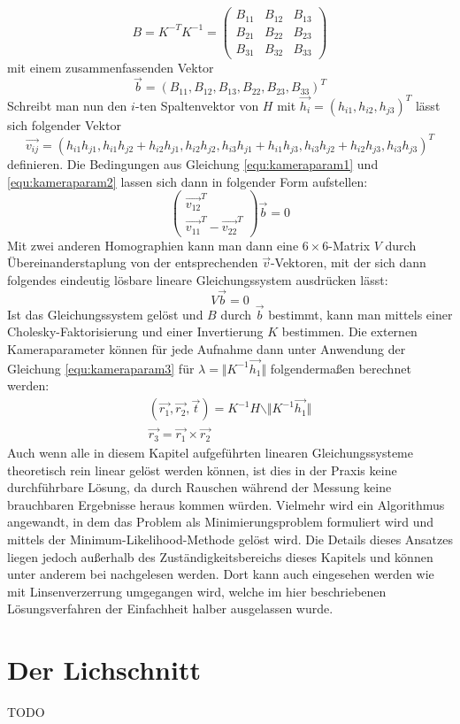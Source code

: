 \begin{equation}
	B = K^{-T}K^{-1} = \begin{pmatrix}
			B_{11} & B_{12} & B_{13} \\
			B_{21} & B_{22} & B_{23} \\
			B_{31} & B_{32} & B_{33}
		\end{pmatrix}
\end{equation}
mit einem zusammenfassenden Vektor
\begin{equation}
	\vec{b} = \left( B_{11}, B_{12}, B_{13}, B_{22}, B_{23}, B_{33} \right)^T
\end{equation}
Schreibt man nun den \(i\)-ten Spaltenvektor von \(H\) mit \(\vec{h_i} = \left( h_{i1}, h_{i2}, h_{j3} \right)^T\) lässt sich folgender Vektor 
\begin{equation}
	\vec{v_{ij}} = \left( h_{i1}h_{j1}, h_{i1}h_{j2}+h_{i2}h_{j1}, h_{i2}h_{j2},h_{i3}h_{j1}+h_{i1}h_{j3}, h_{i3}h_{j2}+h_{i2}h_{j3},h_{i3}h_{j3}\right)^T
\end{equation}
definieren. Die Bedingungen aus Gleichung \ref{equ:kameraparam1} und \ref{equ:kameraparam2} lassen sich dann in folgender Form aufstellen:
\begin{equation}
	\left( \begin{array}{c}\vec{v_{12}}^T\\\vec{v_{11}}^T - \vec{v_{22}}^T\end{array} \right)\vec{b} = 0
\end{equation}
Mit zwei anderen Homographien kann man dann eine \(6 \times 6\)-Matrix \(V\) durch Übereinanderstaplung von der entsprechenden \(\vec{v}\)-Vektoren, mit der sich dann folgendes eindeutig lösbare lineare Gleichungssystem ausdrücken lässt:
\begin{equation}
	V\vec{b} = 0
\end{equation}
Ist das Gleichungssystem gelöst und \(B\) durch \(\vec{b}\) bestimmt, kann man mittels einer Cholesky-Faktorisierung und einer Invertierung \(K\) bestimmen. Die externen Kameraparameter können für jede Aufnahme dann unter Anwendung der Gleichung \ref{equ:kameraparam3} für \(\lambda = \Vert K^{-1}\vec{h_1} \Vert\) folgendermaßen berechnet werden:
\begin{gather}
	\left(\vec{r_1},\vec{r_2},\vec{t}\right) = K^{-1}H \backslash \Vert K^{-1}\vec{h_1} \Vert \\
	\vec{r_3} = \vec{r_1} \times \vec{r_2}
\end{gather}
Auch wenn alle in diesem Kapitel aufgeführten linearen Gleichungssysteme theoretisch rein linear gelöst werden können, ist dies in der Praxis keine durchführbare Lösung, da durch Rauschen während der Messung keine brauchbaren Ergebnisse heraus kommen würden. Vielmehr wird ein Algorithmus angewandt, in dem das Problem als Minimierungsproblem formuliert wird und mittels der Minimum-Likelihood-Methode gelöst wird. Die Details dieses Ansatzes liegen jedoch außerhalb des Zuständigkeitsbereichs dieses Kapitels und können unter anderem bei \cite{Zhang:00} nachgelesen werden. Dort kann auch eingesehen werden wie mit Linsenverzerrung umgegangen wird, welche im hier beschriebenen Lösungsverfahren der Einfachheit halber ausgelassen wurde.

\section{Der Lichschnitt}
TODO